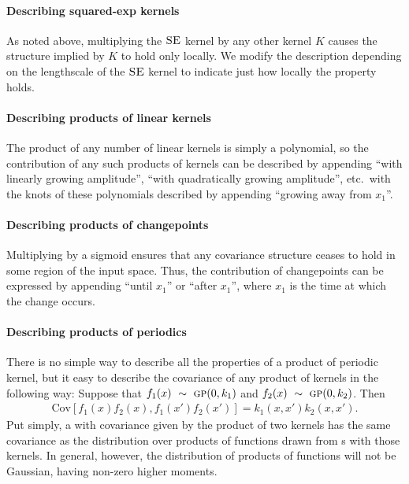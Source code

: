 \documentclass{article}
\begin{document}
\paragraph{Describing squared-exp kernels}
As noted above, multiplying the ${\textsc{SE}}$ kernel by any other kernel $K$ causes the structure implied by $K$ to hold only locally.  We modify the description depending on the lengthscale of the ${\textsc{SE}}$ kernel to indicate just how locally the property holds.

\paragraph{Describing products of linear kernels}
The product of any number of linear kernels is simply a polynomial, so the contribution of any such products of kernels can be described by appending ``with linearly growing amplitude'', ``with quadratically growing amplitude'', etc.\ with the knots of these polynomials described by appending ``growing away from $x_1$''.

\paragraph{Describing products of changepoints}
Multiplying by a sigmoid ensures that any covariance structure ceases to hold in some region of the input space.  Thus, the contribution of changepoints can be expressed by appending ``until $x_1$'' or ``after $x_1$'', where $x_1$ is the time at which the change occurs.

\paragraph{Describing products of periodics}
There is no simple way to describe all the properties of a product of periodic kernel, but it easy to describe the covariance of any product of kernels in the following way:
Suppose that ${f_1(x) \ \sim\  {\textsc{gp}}{}(0, k_1)}$ and ${f_2(x) \ \sim\  {\textsc{gp}}{}(0, k_2)}$.
Then
\begin{align}
{\textrm{Cov} \left[f_1(x)f_2(x), f_1(x')f_2(x') \right] = k_1(x,x')k_2(x,x')}.
\end{align}
Put simply, a \gp{} with covariance given by the product of two kernels has the same covariance as the distribution over products of functions drawn from \gp{}s with those kernels.  In general, however, the distribution of products of functions will not be Gaussian, having non-zero higher moments.
\end{document}
